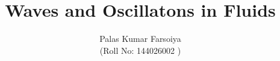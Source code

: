\documentclass[seminar,twoside]{iitbreport}
\begin{document}
\title{Waves and Oscillatons in Fluids}
\author{Palas Kumar Farsoiya \\ (Roll No: 144026002 )}

\maketitle



\begin{abstract}
\end{abstract}

\tableofcontents
\listoftables
\listoffigures

\cleardoublepage
\setcounter{page}{1}

 
 
  



\end{document}
